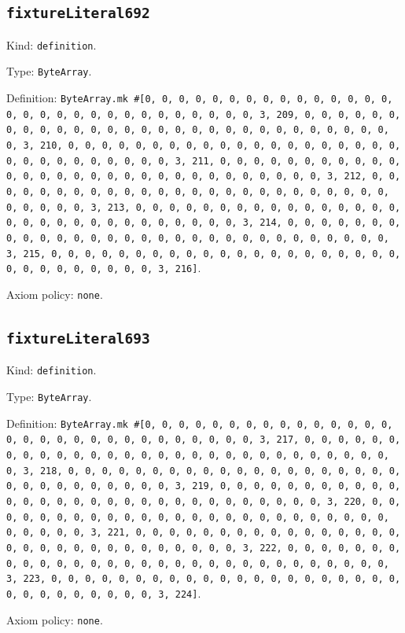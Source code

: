 \documentclass[11pt]{article}
\begin{document}
\subsection*{\texttt{fixtureLiteral692}}
\noindent Kind: \texttt{definition}.\par
\noindent Type: \texttt{ByteArray}.\par
\noindent Definition: \texttt{ByteArray.mk \#[0, 0, 0, 0, 0, 0, 0, 0, 0, 0, 0, 0, 0, 0, 0, 0, 0, 0, 0, 0, 0, 0, 0, 0, 0, 0, 0, 0, 0, 0, 3, 209, 0, 0, 0, 0, 0, 0, 0, 0, 0, 0, 0, 0, 0, 0, 0, 0, 0, 0, 0, 0, 0, 0, 0, 0, 0, 0, 0, 0, 0, 0, 3, 210, 0, 0, 0, 0, 0, 0, 0, 0, 0, 0, 0, 0, 0, 0, 0, 0, 0, 0, 0, 0, 0, 0, 0, 0, 0, 0, 0, 0, 0, 0, 3, 211, 0, 0, 0, 0, 0, 0, 0, 0, 0, 0, 0, 0, 0, 0, 0, 0, 0, 0, 0, 0, 0, 0, 0, 0, 0, 0, 0, 0, 0, 0, 3, 212, 0, 0, 0, 0, 0, 0, 0, 0, 0, 0, 0, 0, 0, 0, 0, 0, 0, 0, 0, 0, 0, 0, 0, 0, 0, 0, 0, 0, 0, 0, 3, 213, 0, 0, 0, 0, 0, 0, 0, 0, 0, 0, 0, 0, 0, 0, 0, 0, 0, 0, 0, 0, 0, 0, 0, 0, 0, 0, 0, 0, 0, 0, 3, 214, 0, 0, 0, 0, 0, 0, 0, 0, 0, 0, 0, 0, 0, 0, 0, 0, 0, 0, 0, 0, 0, 0, 0, 0, 0, 0, 0, 0, 0, 0, 3, 215, 0, 0, 0, 0, 0, 0, 0, 0, 0, 0, 0, 0, 0, 0, 0, 0, 0, 0, 0, 0, 0, 0, 0, 0, 0, 0, 0, 0, 0, 0, 3, 216]}.\par
\noindent Axiom policy: \texttt{none}.\par
\subsection*{\texttt{fixtureLiteral693}}
\noindent Kind: \texttt{definition}.\par
\noindent Type: \texttt{ByteArray}.\par
\noindent Definition: \texttt{ByteArray.mk \#[0, 0, 0, 0, 0, 0, 0, 0, 0, 0, 0, 0, 0, 0, 0, 0, 0, 0, 0, 0, 0, 0, 0, 0, 0, 0, 0, 0, 0, 0, 3, 217, 0, 0, 0, 0, 0, 0, 0, 0, 0, 0, 0, 0, 0, 0, 0, 0, 0, 0, 0, 0, 0, 0, 0, 0, 0, 0, 0, 0, 0, 0, 3, 218, 0, 0, 0, 0, 0, 0, 0, 0, 0, 0, 0, 0, 0, 0, 0, 0, 0, 0, 0, 0, 0, 0, 0, 0, 0, 0, 0, 0, 0, 0, 3, 219, 0, 0, 0, 0, 0, 0, 0, 0, 0, 0, 0, 0, 0, 0, 0, 0, 0, 0, 0, 0, 0, 0, 0, 0, 0, 0, 0, 0, 0, 0, 3, 220, 0, 0, 0, 0, 0, 0, 0, 0, 0, 0, 0, 0, 0, 0, 0, 0, 0, 0, 0, 0, 0, 0, 0, 0, 0, 0, 0, 0, 0, 0, 3, 221, 0, 0, 0, 0, 0, 0, 0, 0, 0, 0, 0, 0, 0, 0, 0, 0, 0, 0, 0, 0, 0, 0, 0, 0, 0, 0, 0, 0, 0, 0, 3, 222, 0, 0, 0, 0, 0, 0, 0, 0, 0, 0, 0, 0, 0, 0, 0, 0, 0, 0, 0, 0, 0, 0, 0, 0, 0, 0, 0, 0, 0, 0, 3, 223, 0, 0, 0, 0, 0, 0, 0, 0, 0, 0, 0, 0, 0, 0, 0, 0, 0, 0, 0, 0, 0, 0, 0, 0, 0, 0, 0, 0, 0, 0, 3, 224]}.\par
\noindent Axiom policy: \texttt{none}.\par
\end{document}
